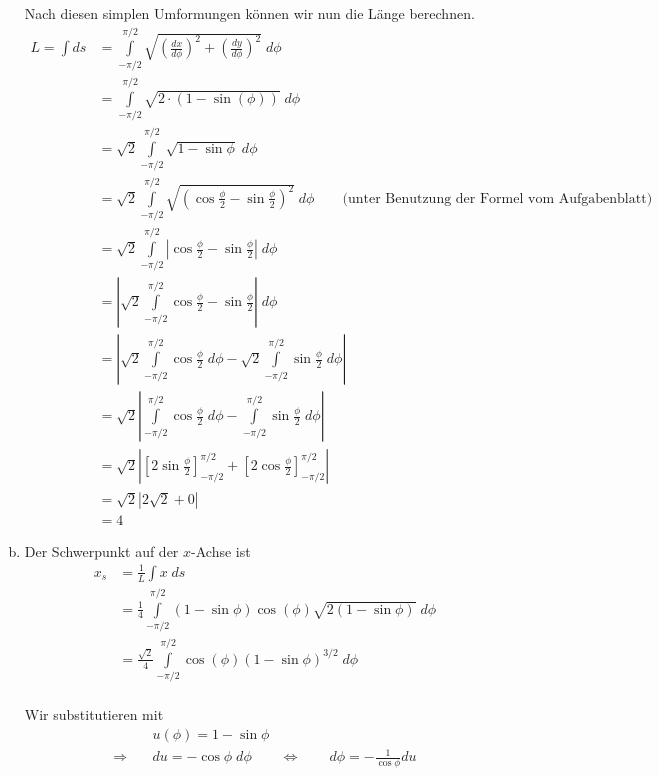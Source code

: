 \documentclass[a4paper,german,12pt,smallheadings]{scrartcl}
\begin{document}
\begin{enumerate}[a)]
    Nach diesen simplen Umformungen können wir nun die Länge berechnen.
    \begin{align*}
      L = \int ds &= \int\limits_{-\pi/2}^{\pi/2} \sqrt{\left(\frac{dx}{d\phi}\right)^2 + \left(\frac{dy}{d\phi}\right)^2} \; d\phi \\
              &= \int\limits_{-\pi/2}^{\pi/2} \sqrt{2\cdot(1- \sin(\phi))} \; d\phi \\
              &= \sqrt{2} \int\limits_{-\pi/2}^{\pi/2} \sqrt{1- \sin \phi} \; d\phi \\
              &= \sqrt{2} \int\limits_{-\pi/2}^{\pi/2} \sqrt{\left(\cos\frac{\phi}{2} - \sin\frac{\phi}{2}\right)^2} \; d\phi  \qquad \text{(unter Benutzung der Formel vom Aufgabenblatt)}\\
              &= \sqrt{2} \int\limits_{-\pi/2}^{\pi/2} \left|\cos\frac{\phi}{2} - \sin\frac{\phi}{2}\right| \; d\phi\\
              &= \left|\sqrt{2} \int\limits_{-\pi/2}^{\pi/2} \cos\frac{\phi}{2} - \sin\frac{\phi}{2}\right| \; d\phi \\
              &= \left|\sqrt{2} \int\limits_{-\pi/2}^{\pi/2} \cos\frac{\phi}{2} \; d\phi - \sqrt{2}\int\limits_{-\pi/2}^{\pi/2} \sin\frac{\phi}{2} \; d\phi \right| \\
              &= \sqrt{2} \left|\int\limits_{-\pi/2}^{\pi/2} \cos\frac{\phi}{2} \; d\phi - \int\limits_{-\pi/2}^{\pi/2} \sin\frac{\phi}{2} \; d\phi \right| \\
              &= \sqrt{2} \left|\left[2\sin \frac{\phi}{2}\right]_{-\pi/2}^{\pi/2} + \left[2\cos \frac{\phi}{2}\right]_{-\pi/2}^{\pi/2} \right| \\
              &= \sqrt{2} \left|2 \sqrt{2} + 0\right| \\
              &= 4
    \end{align*}
  \item
    Der Schwerpunkt auf der $x$-Achse ist
    \begin{align*}
      x_s &= \frac{1}{L} \int x \; ds \\
          &= \frac{1}{4} \int\limits_{-\pi/2}^{\pi/2} (1-\sin \phi)\cos(\phi)\sqrt{2(1- \sin \phi)} \; d\phi \\
          &= \frac{\sqrt{2}}{4} \int\limits_{-\pi/2}^{\pi/2} \cos(\phi)(1- \sin \phi)^{3/2} \; d\phi \\
    \end{align*}

    Wir substitutieren mit
    \begin{align*}
      &u(\phi) = 1 - \sin \phi \\
      \Rightarrow\quad& du = - \cos \phi \; d\phi \qquad \Leftrightarrow \qquad d\phi = -\frac{1}{\cos \phi} du
    \end{align*}


\end{enumerate}
\end{document}
